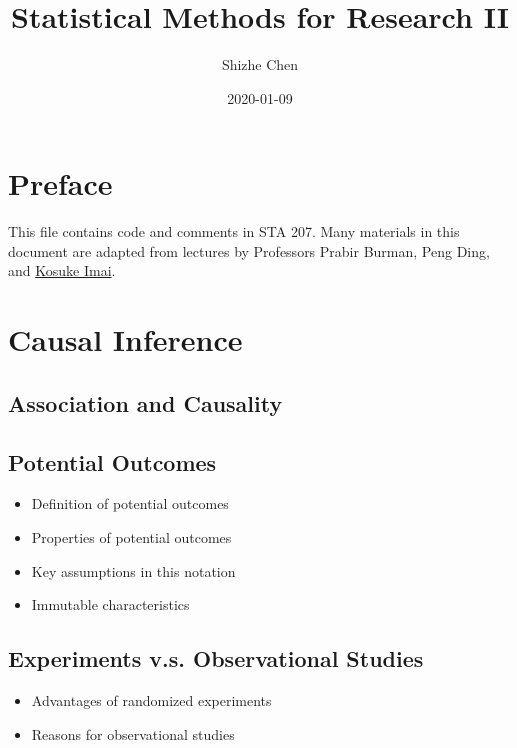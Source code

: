 \documentclass[12pt,]{book}
\title{Statistical Methods for Research II}
\author{Shizhe Chen}
\date{2020-01-09}
\providecommand{\tightlist}{%
  \setlength{\itemsep}{0pt}\setlength{\parskip}{0pt}}
\begin{document}
\maketitle

{
\setcounter{tocdepth}{1}
\tableofcontents
}
\chapter*{Preface}\label{pre}

This file contains code and comments in STA 207. Many materials in this
document are adapted from lectures by Professors Prabir Burman, Peng
Ding, and \href{https://imai.fas.harvard.edu/teaching/index.html}{Kosuke
Imai}.

\chapter{Causal Inference}\label{ch:causal}

\section{Association and Causality}\label{association-and-causality}

\section{Potential Outcomes}\label{potential-outcomes}

\begin{itemize}
\tightlist
\item
  Definition of potential outcomes
\item
  Properties of potential outcomes
\item
  Key assumptions in this notation
\item
  Immutable characteristics
\end{itemize}

\section{Experiments v.s. Observational
Studies}\label{experiments-v.s.-observational-studies}

\begin{itemize}
\tightlist
\item
  Advantages of randomized experiments
\item
  Reasons for observational studies
\end{itemize}
\end{document}
